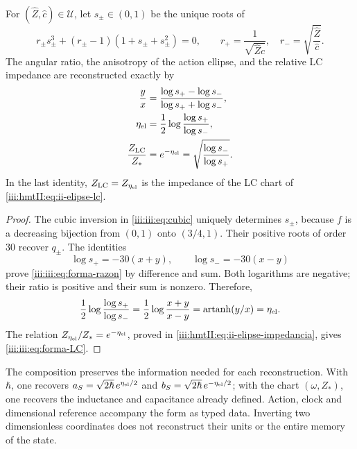 \begin{proposition}
\label{iii:iii:prop:forma-LC}
For $(\widehat Z,\widehat c)\in\mathcal U$, let $s_\pm\in(0,1)$ be the
unique roots of
\begin{equation}
 r_\pm s_\pm^3+(r_\pm-1)(1+s_\pm+s_\pm^2)=0,
 \qquad
 r_+=\frac1{\sqrt{\widehat Z\widehat c}},\quad
 r_-=\sqrt{\frac{\widehat Z}{\widehat c}}.
 \label{iii:iii:eq:forma-inversion}
\end{equation}
The angular ratio, the anisotropy of the action ellipse, and the relative LC
impedance are reconstructed exactly by
\begin{align}
 \frac{y}{x}
 &=\frac{\log s_+-\log s_-}{\log s_++\log s_-},
 \label{iii:iii:eq:forma-razon}\\
 \eta_{\rm el}
 &=\frac12\log\frac{\log s_+}{\log s_-},
 \label{iii:iii:eq:forma-eta}\\
 \frac{Z_{\rm LC}}{Z_*}
 &=e^{-\eta_{\rm el}}
  =\sqrt{\frac{\log s_-}{\log s_+}}.
 \label{iii:iii:eq:forma-LC}
\end{align}
In the last identity, $Z_{\rm LC}=Z_{\eta_{\rm el}}$ is the impedance
of the LC chart of \eqref{iii:hmtII:eq:ii-elipse-lc}.
\end{proposition}
\begin{proof}
The cubic inversion in \eqref{iii:iii:eq:cubic} uniquely determines $s_\pm$,
because $f$ is a decreasing bijection from $(0,1)$ onto
$(3/4,1)$. Their positive roots of order $30$ recover $q_\pm$.
The identities
\[
 \log s_+=-30(x+y),\qquad \log s_-=-30(x-y)
\]
prove \eqref{iii:iii:eq:forma-razon} by difference and sum. Both logarithms
are negative; their ratio is positive and their sum is nonzero. Therefore,
\[
 \frac12\log\frac{\log s_+}{\log s_-}
   =\frac12\log\frac{x+y}{x-y}
   =\operatorname{artanh}(y/x)=\eta_{\rm el}.
\]
The relation $Z_{\eta_{\rm el}}/Z_*=e^{-\eta_{\rm el}}$, proved in
\eqref{iii:hmtII:eq:ii-elipse-impedancia}, gives \eqref{iii:iii:eq:forma-LC}.
\end{proof}

The composition preserves the information needed for each reconstruction.
With $\hbar$, one recovers
$a_S=\sqrt{2\hbar}\,e^{\eta_{\rm el}/2}$ and
$b_S=\sqrt{2\hbar}\,e^{-\eta_{\rm el}/2}$; with the chart
$(\omega,Z_*)$, one recovers the inductance and capacitance already defined.
Action, clock and dimensional reference accompany the form as
typed data. Inverting two dimensionless coordinates does not
reconstruct their units or the entire memory of the state.

